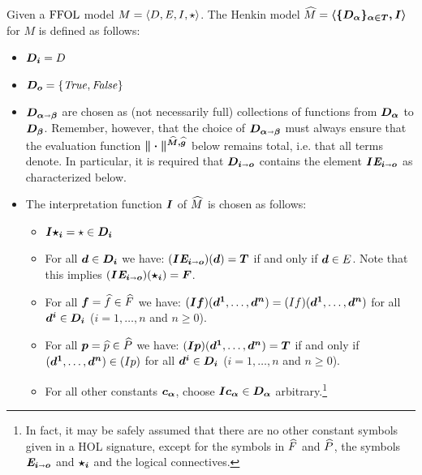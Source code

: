 \begin{defn}\label{def:hm}
Given a $\text{\textrm{FFOL}}$ model $M = \langle D, \mathit{E}, I, \star\rangle$. The Henkin
model $\widehat{M} = \boldsymbol{\langle \{D_\alpha\}_{\alpha \in {T}},I \rangle}$ for
$M$ is defined as follows: 
\begin{itemize}
\item $\boldsymbol{D_i} = D$
\item $\boldsymbol{D_o} = \{\mathit{True},\mathit{False}\}$
\item $\boldsymbol{D_{\alpha\shortrightarrow\beta}}$ are
chosen as (not necessarily full) collections of functions from
$\boldsymbol{D_\alpha}$ to $\boldsymbol{D_\beta}$. Remember, however, that the
choice of $\boldsymbol{D_{\alpha\shortrightarrow\beta}}$ must always ensure that 
the evaluation function 
 $\boldsymbol{\|\cdot\|^{\widehat{M},\widehat{g}}}$ below remains total, i.e. that
 all terms denote. In particular, it is required that $\boldsymbol{D_{i\shortrightarrow
     o}}$ contains the element $\boldsymbol{I \mathit{E}_{i\shortrightarrow
     o}}$ as characterized below.
\item The interpretation function $\boldsymbol{I}$ of $\widehat{M}$
  is chosen as follows:
\begin{itemize}
\item  $\boldsymbol{I \star_i} = \star \in \boldsymbol{D_i}$
\item  For all
    $\boldsymbol{d} \in \boldsymbol{D_i}$ we have: $(\boldsymbol{I \mathit{E}_{i\shortrightarrow o}})(\boldsymbol{d}) =
    \boldsymbol{T}$  if and only if $\boldsymbol{d} \in E$. Note that this implies $(\boldsymbol{I \mathit{E}_{i\shortrightarrow o}})(\boldsymbol{\star_i}) = \boldsymbol{F}$.
\item \sloppy For all $\boldsymbol{f} = \widehat{f} \in \widehat{F}$ we
       have: $(\boldsymbol{I} \boldsymbol{f})(\boldsymbol{d^1},\ldots,\boldsymbol{d^n}) = (I f)(\boldsymbol{d^1},\ldots,\boldsymbol{d^n})$ for
       all $\boldsymbol{d^i}\in \boldsymbol{D_i}$ ($i=1,\ldots,n$ and
       $n\geq 0$).
\item \sloppy For all $\boldsymbol{p} = \widehat{p} \in \widehat{P}$ we
       have: $(\boldsymbol{I} \boldsymbol{p})(\boldsymbol{d^1},\ldots,\boldsymbol{d^n}) = \boldsymbol{T}$
       if and only if $(\boldsymbol{d^1},\ldots,\boldsymbol{d^n}) \in (I p)$ for
       all $\boldsymbol{d^i}\in \boldsymbol{D_i}$ ($i=1,\ldots,n$ and
       $n\geq 0$).
\item For all other constants $\boldsymbol{c_\alpha}$, choose $\boldsymbol{I
    c_\alpha} \in \boldsymbol{D_\alpha}$ arbitrary.\footnote{In fact, it may be safely assumed that there are
  no other constant symbols given in a HOL signature, except for the symbols in
  $\widehat{F}$ and $\widehat{P}$, the symbols $\boldsymbol{\mathit{E}_{i\shortrightarrow o}}$  and $\boldsymbol{\star_{i}}$ and the logical connectives.}
\end{itemize}
\end{itemize}


\end{defn}
